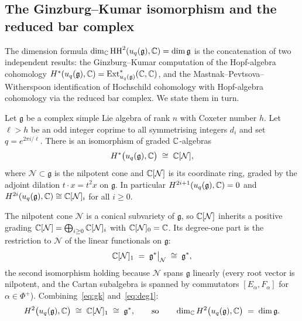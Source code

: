 \subsection{The Ginzburg--Kumar isomorphism and the reduced bar complex}
\label{sec:cat_gk}

The dimension formula $\dim_{\mathbb{C}} \operatorname{HH}^2(u_q(\mathfrak{g}), \mathbb{C}) = \dim \mathfrak{g}$ is the concatenation of two independent results: the Ginzburg--Kumar computation of the Hopf-algebra cohomology $H^*(u_q(\mathfrak{g}), \mathbb{C}) = \operatorname{Ext}^*_{u_q(\mathfrak{g})}(\mathbb{C}, \mathbb{C})$, and the Mastnak--Pevtsova--Witherspoon identification of Hochschild cohomology with Hopf-algebra cohomology via the reduced bar complex. We state them in turn.

\begin{theorem}
\label{thm:gk}
Let $\mathfrak{g}$ be a complex simple Lie algebra of rank $n$ with Coxeter number $h$. Let $\ell > h$ be an odd integer coprime to all symmetrising integers $d_i$ and set $q = e^{2\pi i/\ell}$. There is an isomorphism of graded $\mathbb{C}$-algebras
\begin{equation}
\label{eq:gk}
H^*\bigl(u_q(\mathfrak{g}), \mathbb{C}\bigr) \;\cong\; \mathbb{C}[\mathcal{N}],
\end{equation}
where $\mathcal{N} \subset \mathfrak{g}$ is the nilpotent cone and $\mathbb{C}[\mathcal{N}]$ is its coordinate ring, graded by the adjoint dilation $t \cdot x = t^2 x$ on $\mathfrak{g}$. In particular $H^{2i+1}(u_q(\mathfrak{g}), \mathbb{C}) = 0$ and $H^{2i}(u_q(\mathfrak{g}), \mathbb{C}) \cong \mathbb{C}[\mathcal{N}]_i$ for all $i \geq 0$.
\end{theorem}

The nilpotent cone $\mathcal{N}$ is a conical subvariety of $\mathfrak{g}$, so $\mathbb{C}[\mathcal{N}]$ inherits a positive grading $\mathbb{C}[\mathcal{N}] = \bigoplus_{i \geq 0} \mathbb{C}[\mathcal{N}]_i$ with $\mathbb{C}[\mathcal{N}]_0 = \mathbb{C}$. Its degree-one part is the restriction to $\mathcal{N}$ of the linear functionals on $\mathfrak{g}$:
\begin{equation}
\label{eq:deg1}
\mathbb{C}[\mathcal{N}]_1 \;=\; \mathfrak{g}^*\big|_{\mathcal{N}} \;\cong\; \mathfrak{g}^*,
\end{equation}
the second isomorphism holding because $\mathcal{N}$ spans $\mathfrak{g}$ linearly (every root vector is nilpotent, and the Cartan subalgebra is spanned by commutators $[E_\alpha, F_\alpha]$ for $\alpha \in \Phi^+$). Combining~\eqref{eq:gk} and~\eqref{eq:deg1}:
\begin{equation}
\label{eq:h2dim}
H^2\bigl(u_q(\mathfrak{g}), \mathbb{C}\bigr) \;\cong\; \mathbb{C}[\mathcal{N}]_1 \;\cong\; \mathfrak{g}^*, \qquad \text{so} \qquad \dim_{\mathbb{C}} H^2\bigl(u_q(\mathfrak{g}), \mathbb{C}\bigr) \;=\; \dim \mathfrak{g}.
\end{equation}

